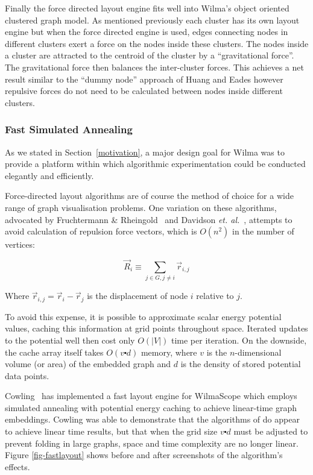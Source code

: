 \documentclass[runningheads]{cl2emult}
\begin{document}
Finally the force directed layout engine fits well into Wilma's object
oriented clustered graph model.  As mentioned previously each cluster
has its own layout engine but when the force directed engine is used,
edges connecting nodes in different clusters exert a force on
the nodes inside these clusters.  The nodes inside a cluster are
attracted to the centroid of the cluster by a ``gravitational force''.
The gravitational force then balances the inter-cluster forces.  This
achieves a net result similar to the ``dummy node'' approach of Huang
and Eades\cite{Huang:GD98} however repulsive forces do not need to be
calculated between nodes inside different clusters.

\subsubsection{Fast Simulated Annealing}

As we stated in Section~\ref{motivation}, a major design goal for Wilma
was to provide a platform within which algorithmic experimentation could be
conducted elegantly and efficiently.

Force-directed layout algorithms are of course the method of choice for a
wide range of graph visualisation problems.  One variation on these
algorithms, advocated by Fruchtermann \&
Rheingold~\cite{fruchtermann90force-directed} and Davidson {\em et.
al.}~\cite{davidson01noise}, attempts to avoid calculation of repulsion force
vectors, which is $O(n^2)$ in the number of vertices:  

\begin{equation}
\vec{R}_i \equiv \sum_{j \in G, j \neq i} \vec{r}_{i,j}
\end{equation}

\noindent Where $\vec{r}_{i,j} = \vec{r}_i - \vec{r}_j$ is the displacement
of node $i$ relative to $j$.

To avoid this expense, it is possible to approximate scalar energy potential
values, caching this information at grid points throughout space.  Iterated
updates to the potential well then cost only $O(|V|)$ time per iteration.  On
the downside, the cache array itself takes $O(v \centerdot d)$ memory, where
$v$ is the $n$-dimensional volume (or area) of the embedded graph and $d$ is
the density of stored potential data points.

Cowling~\cite{cowling02fast} has implemented a fast layout engine for
WilmaScope which employs simulated annealing with potential energy caching
to achieve linear-time graph embeddings.  Cowling was able to demonstrate
that the algorithms of \cite{davidson01noise} do appear to achieve linear
time results, but that when the grid size $v \centerdot d$ must be adjusted to
prevent folding in large graphs, space and time complexity are
no longer linear.  Figure \ref{fig-fastlayout} shows before and after
screenshots of the algorithm's effects.
\end{document}
